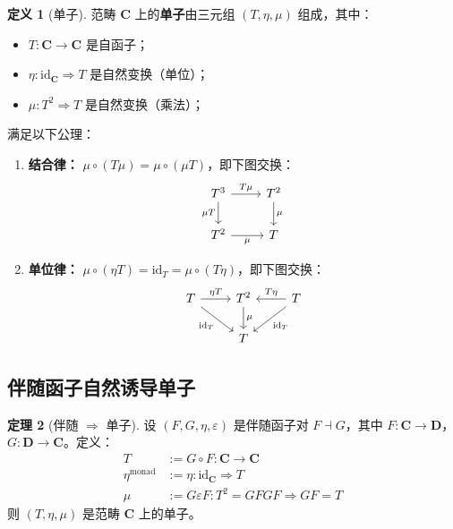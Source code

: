 \documentclass[12pt,a4paper]{ctexart}
\theoremstyle{definition}
\newtheorem{definition}{定义}[section]
\newtheorem{theorem}[definition]{定理}
\newcommand{\cat}[1]{\mathbf{#1}}
\newcommand{\id}{\mathrm{id}}
\newcommand{\dashvadj}{\dashv}
\begin{document}
\begin{definition}[单子]
范畴 $\cat{C}$ 上的\textbf{单子}由三元组 $(T, \eta, \mu)$ 组成，其中：
\begin{itemize}[nosep]
    \item $T: \cat{C} \to \cat{C}$ 是自函子；
    \item $\eta: \id_{\cat{C}} \Rightarrow T$ 是自然变换（单位）；
    \item $\mu: T^2 \Rightarrow T$ 是自然变换（乘法）；
\end{itemize}
满足以下公理：
\begin{enumerate}[label=(M\arabic*),nosep]
    \item \textbf{结合律：} $\mu \circ (T \mu) = \mu \circ (\mu T)$，即下图交换：
    \[
    \begin{tikzcd}
    T^3 \arrow[r,"T\mu"] \arrow[d,"\mu T"'] & T^2 \arrow[d,"\mu"] \\
    T^2 \arrow[r,"\mu"'] & T
    \end{tikzcd}
    \]
    \item \textbf{单位律：} $\mu \circ (\eta T) = \id_T = \mu \circ (T \eta)$，即下图交换：
    \[
    \begin{tikzcd}
    T \arrow[r,"\eta T"] \arrow[dr,"\id_T"'] & T^2 \arrow[d,"\mu"] & T \arrow[l,"T\eta"'] \arrow[dl,"\id_T"] \\
    & T &
    \end{tikzcd}
    \]
\end{enumerate}
\end{definition}

\subsection{伴随函子自然诱导单子}

\begin{theorem}[伴随 $\Rightarrow$ 单子]\label{thm:adj-monad}
设 $(F, G, \eta, \varepsilon)$ 是伴随函子对 $F \dashvadj G$，其中 $F: \cat{C} \to \cat{D}$，$G: \cat{D} \to \cat{C}$。定义：
\begin{align}
T &:= G \circ F : \cat{C} \to \cat{C} \label{eq:T-def}\\
\eta^{\mathrm{monad}} &:= \eta : \id_{\cat{C}} \Rightarrow T \label{eq:eta-monad}\\
\mu &:= G \varepsilon F : T^2 = GFGF \Longrightarrow GF = T \label{eq:mu-def}
\end{align}
则 $(T, \eta, \mu)$ 是范畴 $\cat{C}$ 上的单子。
\end{theorem}
\end{document}
